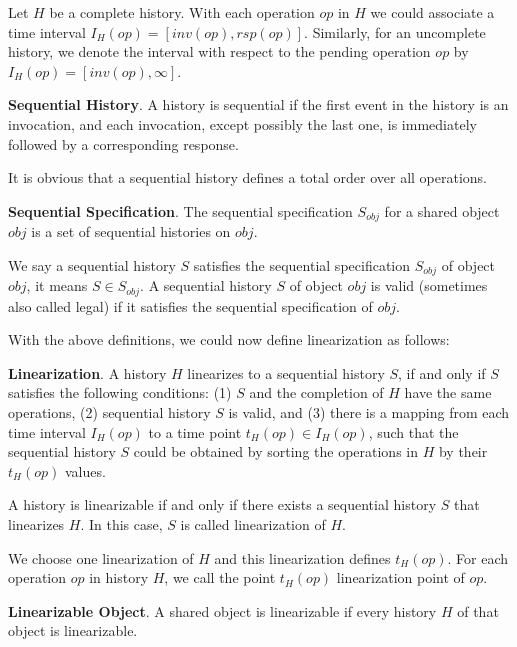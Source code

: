 Let $H$ be a complete history. With each operation $op$ in $H$ we could associate a time interval $I_H(op) = [inv(op), rsp(op)]$. Similarly, for an uncomplete history, we denote the interval with respect to the pending operation $op$ by $I_H(op) = [inv(op), \infty]$.

\begin{definition}{\textbf{Sequential History}.}
A history is sequential if the first event in the history is an invocation, and each invocation, except possibly the last one, is immediately followed by a corresponding response.
\end{definition}

It is obvious that a sequential history defines a total order over all operations.

\begin{definition}{\textbf{Sequential Specification}.}
The sequential specification $S_{obj}$ for a shared object $obj$ is a set of sequential histories on $obj$.
\end{definition}

We say a sequential history $S$ satisfies the sequential specification $S_{obj}$ of object $obj$, it means $S \in S_{obj}$. A sequential history $S$ of object $obj$ is valid (sometimes also called legal) if it satisfies the sequential specification of $obj$.

With the above definitions, we could now define linearization as follows:

\begin{definition}{\textbf{Linearization}.}
A history $H$ linearizes to a sequential history $S$, if and only if $S$ satisfies the following conditions: (1) $S$ and the completion of $H$ have the same operations, (2) sequential history $S$ is valid, and (3) there is a mapping from each time interval $I_H(op)$ to a time point $t_H(op) \in I_H(op)$, such that the sequential history $S$ could be obtained by sorting the operations in $H$ by their $t_H(op)$ values.
\end{definition}

A history is linearizable if and only if there exists a sequential history $S$ that linearizes $H$. In this case, $S$ is called linearization of $H$.

We choose one linearization of $H$ and this linearization defines $t_H(op)$. For each operation $op$ in history $H$, we call the point $t_H(op)$ linearization point of $op$.

\begin{definition}{\textbf{Linearizable Object}.}
A shared object is linearizable if every history $H$ of that object is linearizable.
\end{definition}



